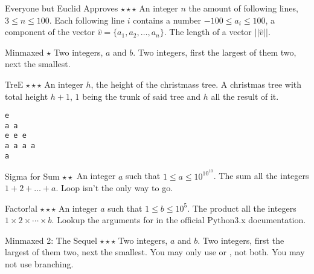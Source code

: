 \begin{task}{Everyone but Euclid Approves $\star\star\star$}
\In
An integer $n$ the amount of following lines, $3 \leq n \leq 100$. 
Each following line $i$ contains a number $-100 \leq a_i \leq 100$, a 
component of the vector $\hat{v} = \{a_1, a_2, \dots, a_n\}$.
\Out
The length of a vector $||\hat{v}||$.
\end{task}

\begin{task}{Minmaxed $\star$}
\In
Two integers, $a$ and $b$.
\Out
Two integers, first the largest of them two, next the smallest.
\end{task}

\begin{task}{TreE $\star\star\star$}
\In
An integer $h$, the height of the christmass tree.
\Out
A christmas tree with total height $h + 1$, $1$ being the trunk of said
tree and $h$ all the result of it.
\begin{verbatim}
e
a a
e e e 
a a a a
a
\end{verbatim}
\end{task}

\begin{task}{Sigma for Sum $\star\star$}
\In
An integer $a$ such that $1 \leq a \leq 10^{10^{10}}$.
\Out
The sum all the integers $1 + 2 + \dots + a$.
\Hint
Loop isn't the only way to go.
\end{task}

\begin{task}{Factor!al $\star\star\star$}
\In
An integer $a$ such that $1 \leq b \leq 10^{5}$.
\Out
The product all the integers $1 \times 2 \times \cdots \times b$.
\Hint
Lookup the arguments for  in the official Python3.x documentation.
\end{task}

\begin{task}{Minmaxed 2: The Sequel $\star\star\star$}
\In
Two integers, $a$ and $b$.
\Out
Two integers, first the largest of them two, next the smallest.
\Note
You may  only use  or , not both. You may not use branching.
\end{task}
